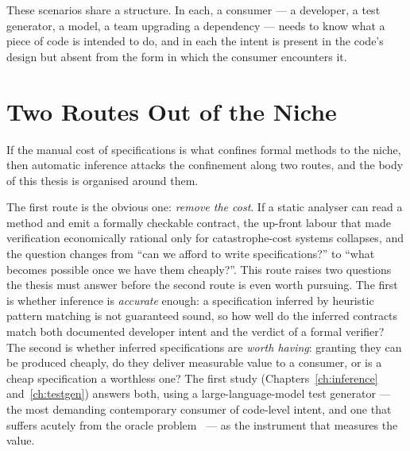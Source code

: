 These scenarios share a structure. In each, a consumer --- a developer, a test
generator, a model, a team upgrading a dependency --- needs to know what a piece
of code is intended to do, and in each the intent is present in the code's design
but absent from the form in which the consumer encounters it.

\section{Two Routes Out of the Niche}

If the manual cost of specifications is what confines formal methods to the
niche, then automatic inference attacks the confinement along two routes, and
the body of this thesis is organised around them.

The first route is the obvious one: \emph{remove the cost}. If a static analyser
can read a method and emit a formally checkable contract, the up-front labour
that made verification economically rational only for catastrophe-cost systems
collapses, and the question changes from ``can we afford to write
specifications?'' to ``what becomes possible once we have them cheaply?''. This
route raises two questions the thesis must answer before the second route is even
worth pursuing. The first is whether inference is \emph{accurate} enough: a
specification inferred by heuristic pattern matching is not guaranteed sound, so
how well do the inferred contracts match both documented developer intent and the
verdict of a formal verifier? The second is whether inferred specifications are
\emph{worth having}: granting they can be produced cheaply, do they deliver
measurable value to a consumer, or is a cheap specification a worthless one? The
first study (Chapters~\ref{ch:inference} and~\ref{ch:testgen}) answers both,
using a large-language-model test generator --- the most demanding contemporary
consumer of code-level intent, and one that suffers acutely from the oracle
problem~\cite{konstantinou2024oracles, schafer2023adaptive} --- as the instrument
that measures the value.

